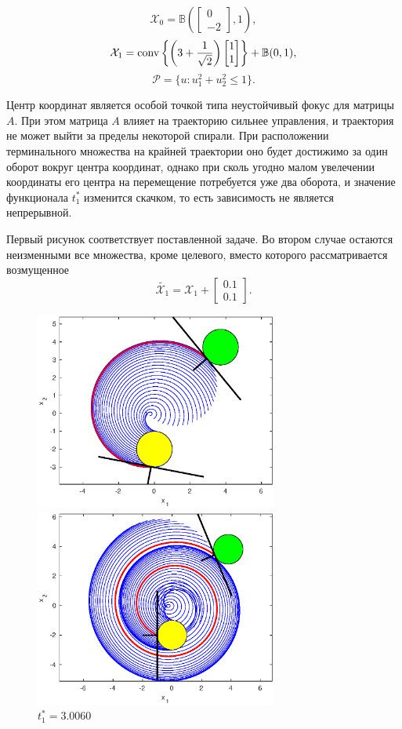 \documentclass[11pt]{article}
\newcommand\PS{\mathcal{P}}
\newcommand\X{\mathcal{X}}
\newcommand\Cl[2]{\begin{bmatrix}
#1 \\ #2
\end{bmatrix}}
\newcommand\Conv[1]{{\rm conv}\left\{ #1 \right\}}
\begin{document}
$$\X_0 = \mathbb{B}\left(\Cl{0}{-2}, 1\right),$$
$$\X_1 = \Conv{\left(3 + \frac1{\sqrt{2}}\right)\Cl{1}{1}} + \mathbb{B}(0, 1),$$
$$\PS = \{u\colon u_1^2 + u_2^2 \le 1\}.$$

Центр координат является особой точкой типа неустойчивый фокус для матрицы $A$. При этом матрица
$A$ влияет на траекторию сильнее управления, и траектория не может выйти за пределы некоторой спирали.
При расположении терминального множества на крайней траектории оно будет достижимо за один оборот
вокруг центра координат, однако при сколь угодно малом увелечении координаты его центра на перемещение
потребуется уже два оборота, и значение функционала $t_1^*$ изменится скачком, то есть зависимость не
является непрерывной.

Первый рисунок соответствует поставленной задаче. Во втором случае
остаются неизменными все множества, кроме целевого, вместо которого рассматривается возмущенное 
$$ \tilde{\X_1} = \X_1 + \Cl{0.1}{0.1}.$$


\begin{figure}[h]
\begin{multicols}{2}
	\hfill
	\includegraphics[width=80mm]{3_1.eps}
	\hfill
	\caption{$t_1^* = 1.2680$}
	\hfill
	\includegraphics[width=80mm]{3_2.eps}
	\hfill
	\caption{$t_1^* = 3.0060$}
\end{multicols}
\end{figure}	
\end{document}
